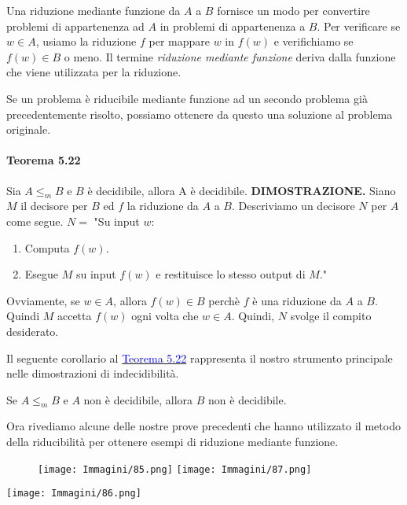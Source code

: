 \documentclass{article}
\begin{document}
Una riduzione mediante funzione da $A$ a $B$ fornisce un modo per convertire problemi di appartenenza ad $A$ in problemi di appartenenza a $B$.
Per verificare se $w \in A$, usiamo la riduzione $f$ per mappare $w$ in $f(w)$ e verifichiamo se $f(w) \in B$ o meno.
Il termine \textit{riduzione mediante funzione} deriva dalla funzione che viene utilizzata per la riduzione.

Se un problema è riducibile mediante funzione ad un secondo problema già precedentemente risolto, possiamo ottenere da questo una soluzione al problema originale.

\paragraph{Teorema 5.22}
\label{teorema-5.22}
\text{}
\newline
Sia $A \leq_m B$ e $B$ è decidibile, allora A è decidibile.
\vspace{1em}
\text{}
\newline
\hbox{\textbf{DIMOSTRAZIONE.}}
Siano $M$ il decisore per $B$ ed $f$ la riduzione da $A$ a $B$.
Descriviamo un decisore $N$ per $A$ come segue.
\vspace{1em}
\text{}
\newline
$N = $ "Su input $w$:
\begin{enumerate}
    \item Computa $f(w)$.
    \item Esegue $M$ su input $f(w)$ e restituisce lo stesso output di $M$."
\end{enumerate}
Ovviamente, se $w \in A$, allora $f(w) \in B$ perchè $f$ è una riduzione da $A$ a $B$.
Quindi $M$ accetta $f(w)$ ogni volta che $w \in A$.
Quindi, $N$ svolge il compito desiderato.

Il seguente corollario al \hyperref[teorema-5.22]{\textcolor{blue}{Teorema 5.22}} rappresenta il nostro strumento principale nelle dimostrazioni di indecidibilità.
\vspace{1em}
\text{}
\newline
\begin{tcolorbox}[title=Corollario 5.23]
    Se $A \leq_m B$ e $A$ non è decidibile, allora $B$ non è decidibile.
\end{tcolorbox}
Ora rivediamo alcune delle nostre prove precedenti che hanno utilizzato il metodo della riducibilità per ottenere esempi di riduzione mediante funzione.
\begin{figure}[H]
    \centering
    \texttt{[image: Immagini/85.png]}
    \texttt{[image: Immagini/87.png]}
    \label{fig:example}
\end{figure}
\texttt{[image: Immagini/86.png]}
\newpage
\end{document}
